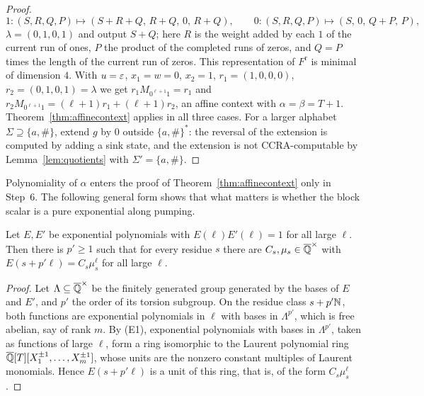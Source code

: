 \begin{proof}
\[
1:(S,R,Q,P)\mapsto(S+R+Q,\,R+Q,\,0,\,R+Q),\qquad 0:(S,R,Q,P)\mapsto(S,\,0,\,Q+P,\,P),
\]
$\lambda=(0,1,0,1)$ and output $S+Q$; here $R$ is the weight added by each $1$ of the current run of ones, $P$ the product of the completed runs of zeros, and $Q=P$ times the length of the current run of zeros. This representation of $F^{\mathrm r}$ is minimal of dimension $4$. With $u=\varepsilon$, $x_1=w=0$, $x_2=1$, $r_1=(1,0,0,0)$, $r_2=(0,1,0,1)=\lambda$ we get $r_1M_{0^{\ell+1}1}=r_1$ and $r_2M_{0^{\ell+1}1}=(\ell+1)r_1+(\ell+1)r_2$, an affine context with $\alpha=\beta=T+1$. Theorem~\ref{thm:affinecontext} applies in all three cases. For a larger alphabet $\Sigma\supseteq\{a,\#\}$, extend $g$ by $0$ outside $\{a,\#\}^*$: the reversal of the extension is computed by adding a sink state, and the extension is not CCRA-computable by Lemma~\ref{lem:quotients} with $\Sigma'=\{a,\#\}$.
\end{proof}

Polynomiality of $\alpha$ enters the proof of Theorem~\ref{thm:affinecontext} only in Step~6. The following general form shows that what matters is whether the block scalar is a pure exponential along pumping.

\begin{lemma}\label{lem:units}
Let $E,E'$ be exponential polynomials with $E(\ell)E'(\ell)=1$ for all large $\ell$. Then there is $p'\ge1$ such that for every residue $s$ there are $C_s,\mu_s\in\overline{\mathbb{Q}}^\times$ with $E(s+p'\ell)=C_s\mu_s^\ell$ for all large $\ell$.
\end{lemma}
\begin{proof}
Let $\Lambda\subseteq\overline{\mathbb{Q}}^\times$ be the finitely generated group generated by the bases of $E$ and $E'$, and $p'$ the order of its torsion subgroup. On the residue class $s+p'\mathbb{N}$, both functions are exponential polynomials in $\ell$ with bases in $\Lambda^{p'}$, which is free abelian, say of rank $m$. By (E1), exponential polynomials with bases in $\Lambda^{p'}$, taken as functions of large $\ell$, form a ring isomorphic to the Laurent polynomial ring $\overline{\mathbb{Q}}[T][X_1^{\pm1},\ldots,X_m^{\pm1}]$, whose units are the nonzero constant multiples of Laurent monomials. Hence $E(s+p'\ell)$ is a unit of this ring, that is, of the form $C_s\mu_s^\ell$.
\end{proof}

